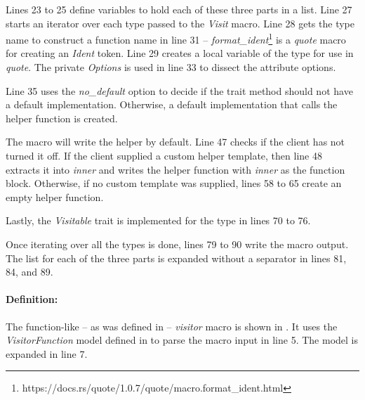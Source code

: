 Lines 23 to 25 define variables to hold each of these three parts in a list.
Line 27 starts an iterator over each type passed to the \textit{Visit} macro.
Line 28 gets the type name to construct a function name in line 31 -- \textit{format\_ident}\footnote{https://docs.rs/quote/1.0.7/quote/macro.format\_ident.html} is a \textit{quote} macro for creating an \textit{Ident} token.
Line 29 creates a local variable of the type for use in \textit{quote}.
The private \textit{Options} is used in line 33 to dissect the attribute options.

Line 35 uses the \textit{no\_default} option to decide if the trait method should not have a default implementation.
Otherwise, a default implementation that calls the helper function is created.

The macro will write the helper by default.
Line 47 checks if the client has not turned it off.
If the client supplied a custom helper template, then line 48 extracts it into \textit{inner} and writes the helper function with \textit{inner} as the function block.
Otherwise, if no custom template was supplied, lines 58 to 65 create an empty helper function.

Lastly, the \textit{Visitable} trait is implemented for the type in lines 70 to 76.

Once iterating over all the types is done, lines 79 to 90 write the macro output.
The list for each of the three parts is expanded without a separator in lines 81, 84, and 89.

\paragraph{Definition:}
The function-like -- as was defined in  -- \textit{visitor} macro is shown in .
It uses the \textit{VisitorFunction} model defined in  to parse the macro input in line 5.
The model is expanded in line 7.